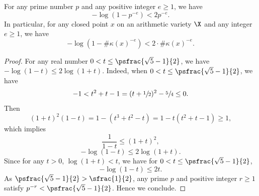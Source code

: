 \begin{lem}\label{boundlog}
For any prime number $p$ and any positive integer $e\geq 1$, we have
\[
- \log(1-p^{-e})<2p^{-e}.
\]
In particular, for any closed point $x$ on an arithmetic variety $\X$ and any integer $e\geq 1$, we have
\[
- \log(1-\#\kappa(x)^{-e})<2\cdot\#\kappa(x)^{-e}.
\]
\end{lem}
\begin{proof}
For any real number $0<t\leq \psfrac{\sqrt{5}-1}{2}$, we have $-\log(1-t)\leq 2\log(1+t)$. Indeed, when $0<t\leq \psfrac{\sqrt{5}-1}{2}$, we have
\[
-1<t^2+t-1=(t+\sfrac{1}{2})^2-\sfrac{5}{4}\leq 0.
\]
Then
\[
(1+t)^2(1-t)=1-(t^3+t^2-t)=1-t(t^2+t-1)\geq 1,
\]
which implies
\[
\frac{1}{1-t}\leq (1+t)^2,
\]
\ie
\[
-\log(1-t)\leq 2\log(1+t).
\]
Since for any $t>0$, $\log(1+t)<t$, we have for $0<t\leq \psfrac{\sqrt{5}-1}{2}$,
\[
-\log(1-t)\leq 2t.
\]
As $\psfrac{\sqrt{5}-1}{2}>\sfrac{1}{2}$, any prime $p$ and positive integer $r\geq 1$ satisfy $p^{-r}< \psfrac{\sqrt{5}-1}{2}$. Hence we conclude.
\end{proof}

